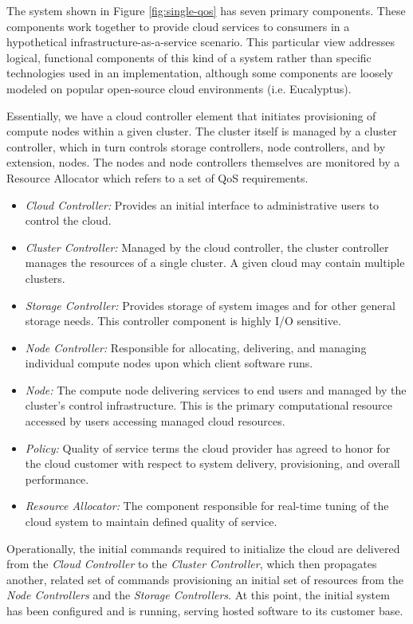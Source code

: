 \documentclass[10pt,letterpaper]{book}
\begin{document}
The system shown in Figure \ref{fig:single-qos} has seven primary components.  These components work together to provide cloud services to consumers in a hypothetical infrastructure-as-a-service scenario.  This particular view addresses logical, functional components of this kind of a system rather than specific technologies used in an implementation, although some components are loosely modeled on popular open-source cloud environments (i.e. Eucalyptus).

Essentially, we have a cloud controller element that initiates provisioning of compute nodes within a given cluster. The cluster itself is managed by a cluster controller, which in turn controls storage controllers, node controllers, and by extension, nodes.  The nodes and node controllers themselves are monitored by a Resource Allocator which refers to a set of QoS requirements.

\begin{itemize}
\item \textit{Cloud Controller:} Provides an initial interface to administrative users to control the cloud.
\item \textit{Cluster Controller:} Managed by the cloud controller, the cluster controller manages the resources of a single cluster. A given cloud may contain multiple clusters.
\item \textit{Storage Controller:} Provides storage of system images and for other general storage needs.  This controller component is highly I/O sensitive.
\item \textit{Node Controller:} Responsible for allocating, delivering, and managing individual compute nodes upon which client software runs.
\item \textit{Node:} The compute node delivering services to end users and managed by the cluster's control infrastructure.  This is the primary computational resource accessed by users accessing managed cloud resources.
\item \textit{Policy:} Quality of service terms the cloud provider has agreed to honor for the cloud customer with respect to system delivery, provisioning, and overall performance.
\item \textit{Resource Allocator:} The component responsible for real-time tuning of the cloud system to maintain defined quality of service.
\end{itemize}

Operationally, the initial commands required to initialize the cloud are delivered from the \textit{Cloud Controller} to the \textit{Cluster Controller}, which then propagates another, related set of commands provisioning an initial set of resources from the \textit{Node Controllers} and the \textit{Storage Controllers}.  At this point, the initial system has been configured and is running, serving hosted software to its customer base.
\end{document}
